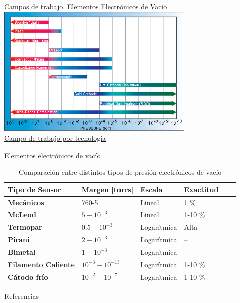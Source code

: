 \documentclass[aspectratio=169]{beamer}
\begin{document}
\begin{frame}{Campos de trabajo. Elementos Electrónicos de Vacío}
            \centering
            \includegraphics[width=9.5cm]{fig/Presion/Vaccuum Gauges.jpg}
             \\ \tiny{\href{https://www.lesker.com/newweb/technical_info/vacuumtech/pressure_04_bestgauge.cfm}{Campo de trabajo por tecnología}}
       
\end{frame}


\begin{frame}{Elementos electrónicos de vacío}
 \begin{table}[]
 \footnotesize
    \centering
    \begin{tabular}{m{3.2cm} m{1.2cm} m{1.2cm} m{1.9cm} m{1.8cm} m{1.6cm}}
        \toprule
        \textbf{Tipo de Sensor} & \textbf{Margen [torrs]} & \textbf{Escala} &\textbf{Exactitud}\\
        \midrule
        \textbf{Mecánicos} & 760-5 & Lineal & 1 \% \\
        \textbf{McLeod} & $5 - 10^{-3}$ & Lineal & 1-10 \% \\
        \textbf{Termopar} & $0.5 - 10^{-3}$ & Logarítmica & Alta\\
        \textbf{Pirani} & $2 - 10^{-3}$ & Logarítmica & -- \\
        \textbf{Bimetal} & $1 - 10^{-3}$ & Logarítmica & -- \\
        \textbf{Filamento Caliente} & $10^{-3} - 10^{-13}$ & Logarítmica & 1-10 \% \\
        \textbf{Cátodo frío} & $10^{-2} - 10^{-7}$ & Logarítmica & 1-10 \% \\
        \bottomrule
    \end{tabular}
    \caption{Comparación entre distintos tipos de presión electrónicos de vacío} \cite{sole2005instrumentacion}
    \label{tab:Comparacionvacio}
\end{table}
\end{frame}


\begin{frame}{Referencias}

\footnotesize

\end{frame}
\end{document}

